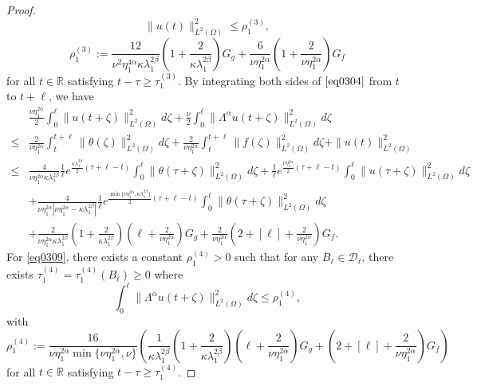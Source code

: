\documentclass[oneside,preprint,12pt,numbers,sort&compress]{elsarticle}
\begin{document}
\begin{proof}
\begin{equation}\label{eq0315}
    \|u(t)\|_{L^2(\Omega)}^2 
    \leq 
    \rho_{1}^{(3)},
\end{equation}
\[
    \rho_{1}^{(3)} 
    := 
    \frac{12}{\nu^{2}\eta_1^{4\alpha}\kappa\lambda_{1}^{2\beta}}
    \left(1+\frac{2}{\kappa\lambda_{1}^{2\beta}}\right)
    G_g
    + 
    \frac{6}{\nu\eta_1^{2\alpha}} \left(1+\frac{2}{\nu\eta_1^{2\alpha}}\right)G_f
\]  
for all $t \in \mathbb{R}$ satisfying $t - \tau \geq \tau_{1}^{(3)}$. By integrating both sides of $\eqref{eq0304}$ from $t$ to $t+\ell$, we have
\begin{equation}\label{eq0309}
\begin{aligned}
  &\frac{\nu\eta_1^{2\alpha}}{2} \int_{0}^{\ell} \|u(t+\zeta)\|_{L^2(\Omega)}^2 d\zeta + \frac{\nu}{2} \int_{0}^{\ell} \| \Lambda^\alpha u(t+\zeta)\|_{L^2(\Omega)}^2 d\zeta \\
  \leq 
  &
  \frac{2}{\nu\eta_1^{2\alpha}} \int_{t}^{t+\ell} \|\theta(\zeta)\|_{L^2(\Omega)}^2 d\zeta 
  +\frac{2}{\nu\eta_1^{2\alpha}} \int_{t}^{t+\ell} \|f(\zeta)\|_{L^2(\Omega)}^2 d\zeta 
  + \|u(t)\|_{L^2(\Omega)}^2 \\
  \leq 
  & 
  \frac{4}{\nu\eta_1^{2\alpha}\kappa\lambda_1^{2\beta}} \frac{1}{\ell} e^{\frac{\kappa\lambda_{1}^{2\beta}}{2}(\tau+\ell-t)} \int_{0}^{\ell} \|\theta(\tau+\zeta)\|_{L^2(\Omega)}^2 d\zeta
  + \frac{1}{\ell} e^{\frac{\nu\eta_1^{2\alpha}}{2}(\tau+\ell-t)}  \int_{0}^{\ell} \|u(\tau+\zeta)\|_{L^2(\Omega)}^2 d\zeta \\
  &
   + \frac{4}{\nu\eta_1^{2\alpha}|\nu\eta_1^{2\alpha} - \kappa\lambda_1^{2\beta}|}  
   \frac{1}{\ell}
   e^{\frac{\min\{\nu\eta_1^{2\alpha},\kappa\lambda_1^{2\beta}\}}{2}(\tau+\ell-t)}
   \int_{0}^{\ell} 
   \|\theta(\tau+\zeta)\|_{L^2(\Omega)}^2  d\zeta \\
  &
  + \frac{2}{\nu\eta_1^{2\alpha}\kappa\lambda_{1}^{2\beta}} 
  \left(1+\frac{2}{\kappa\lambda_{1}^{2\beta}}\right)
  \left(\ell+\frac{2}{\nu\eta_1^{2\alpha}}\right)
  G_g
  + \frac{2}{\nu\eta_1^{2\alpha}} \left(2+[\ell]+\frac{2}{\nu\eta_1^{2\alpha}}\right)G_f.
\end{aligned}
\end{equation}
For \cref{eq0309}, there exists a constant $\rho_{1}^{(4)} > 0$ such that for any $B_{\ell} \in \mathcal{D}_{\ell}$, there exists $\tau_{1}^{(4)} = \tau_{1}^{(4)}(B_{\ell}) \geq 0$ where   
\begin{equation}\label{eq0314}
    \int_{0}^{\ell} \| \Lambda^\alpha u(t+\zeta)\|_{L^2(\Omega)}^2 d\zeta
    \leq 
    \rho_{1}^{(4)},
\end{equation} 
with
\[
    \rho_{1}^{(4)} 
    := 
    \frac{16}{\nu\eta_1^{2\alpha}\min\{\nu\eta_1^{2\alpha},\nu\}}
    \left(
    \frac{1}{\kappa\lambda_{1}^{2\beta}} 
    \left(1+\frac{2}{\kappa\lambda_{1}^{2\beta}}\right)
    \left(\ell+\frac{2}{\nu\eta_1^{2\alpha}}\right)
    G_g
    + 
    \left(2+[\ell]+\frac{2}{\nu\eta_1^{2\alpha}}\right)G_f\right)
\]
for all $t \in \mathbb{R}$ satisfying $t - \tau \geq \tau_{1}^{(4)}$.


\end{proof}
\end{document}
